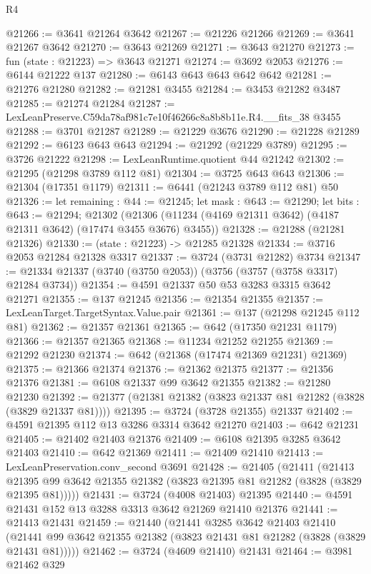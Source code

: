 \begin{lexlean}{R4}
\begin{coremodule}
@21266 := @3641 @21264 @3642
@21267 := @21226 @21266
@21269 := @3641 @21267 @3642
@21270 := @3643 @21269
@21271 := @3643 @21270
@21273 := fun (state : @21223) => @3643 @21271
@21274 := @3692 @2053
@21276 := @6144 @21222 @137
@21280 := @6143 @643 @643 @642 @642
@21281 := @21276 @21280
@21282 := @21281 @3455
@21284 := @3453 @21282 @3487
@21285 := @21274 @21284
@21287 := LexLeanPreserve.C59da78af981c7e10f46266c8a8b8b11e.R4.__fits_38 @3455
@21288 := @3701 @21287
@21289 := @21229 @3676
@21290 := @21228 @21289
@21292 := @6123 @643 @643
@21294 := @21292 (@21229 @3789)
@21295 := @3726 @21222
@21298 := LexLeanRuntime.quotient @44 @21242
@21302 := @21295 (@21298 @3789 @112 @81)
@21304 := @3725 @643 @643
@21306 := @21304 (@17351 @1179)
@21311 := @6441 (@21243 @3789 @112 @81) @50
@21326 := let remaining : @44 := @21245;
  let mask : @643 := @21290;
  let bits : @643 := @21294;
  @21302 (@21306 (@11234 (@4169 @21311 @3642) (@4187 @21311 @3642) (@17474 @3455 @3676) @3455))
@21328 := @21288 (@21281 @21326)
@21330 := (state : @21223) -> @21285 @21328
@21334 := @3716 @2053 @21284 @21328 @3317
@21337 := @3724 (@3731 @21282) @3734
@21347 := @21334 @21337 (@3740 (@3750 @2053)) (@3756 (@3757 (@3758 @3317) @21284 @3734))
@21354 := @4591 @21337 @50 @53 @3283 @3315 @3642 @21271
@21355 := @137 @21245
@21356 := @21354 @21355
@21357 := LexLeanTarget.TargetSyntax.Value.pair
@21361 := @137 (@21298 @21245 @112 @81)
@21362 := @21357 @21361
@21365 := @642 (@17350 @21231 @1179)
@21366 := @21357 @21365
@21368 := @11234 @21252 @21255
@21369 := @21292 @21230
@21374 := @642 (@21368 (@17474 @21369 @21231) @21369)
@21375 := @21366 @21374
@21376 := @21362 @21375
@21377 := @21356 @21376
@21381 := @6108 @21337 @99 @3642 @21355
@21382 := @21280 @21230
@21392 := @21377 (@21381 @21382 (@3823 @21337 @81 @21282 (@3828 (@3829 @21337 @81))))
@21395 := @3724 (@3728 @21355) @21337
@21402 := @4591 @21395 @112 @13 @3286 @3314 @3642 @21270
@21403 := @642 @21231
@21405 := @21402 @21403 @21376
@21409 := @6108 @21395 @3285 @3642 @21403
@21410 := @642 @21369
@21411 := @21409 @21410
@21413 := LexLeanPreservation.conv_second @3691
@21428 := @21405
    (@21411
      (@21413 @21395 @99 @3642 @21355 @21382 (@3823 @21395 @81 @21282 (@3828 (@3829 @21395 @81)))))
@21431 := @3724 (@4008 @21403) @21395
@21440 := @4591 @21431 @152 @13 @3288 @3313 @3642 @21269 @21410 @21376
@21441 := @21413 @21431
@21459 := @21440
    (@21441
      @3285
      @3642
      @21403
      @21410
      (@21441 @99 @3642 @21355 @21382 (@3823 @21431 @81 @21282 (@3828 (@3829 @21431 @81)))))
@21462 := @3724 (@4609 @21410) @21431
@21464 := @3981 @21462 @329

\end{coremodule}
\end{lexlean}

